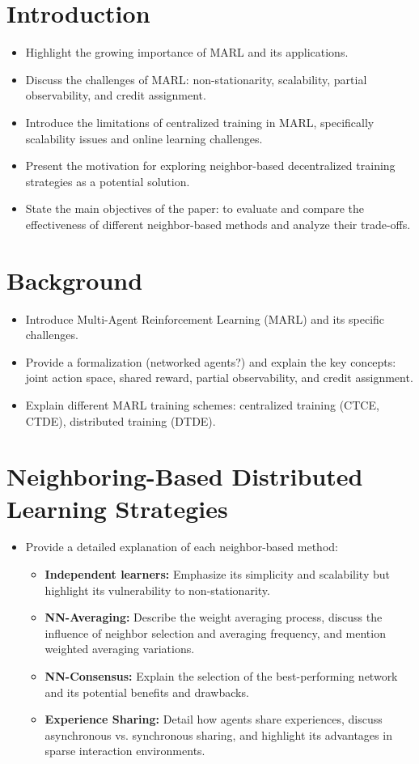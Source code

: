 \documentclass[sigconf]{acmart}
\begin{document}
\section{Introduction}
\begin{itemize}
\item Highlight the growing importance of MARL and its applications.
\item Discuss the challenges of MARL: non-stationarity, scalability, partial observability, and credit assignment.
\item Introduce the limitations of centralized training in MARL, specifically scalability issues and online learning challenges.
\item Present the motivation for exploring neighbor-based decentralized training strategies as a potential solution.
\item State the main objectives of the paper: to evaluate and compare the effectiveness of different neighbor-based methods and analyze their trade-offs.
\end{itemize}

\section{Background}
\begin{itemize}
\item Introduce Multi-Agent Reinforcement Learning (MARL) and its specific challenges.
\item Provide a formalization (networked agents?) and explain the key concepts: joint action space, shared reward, partial observability, and credit assignment.
\item Explain different MARL training schemes: centralized training (CTCE, CTDE), distributed training (DTDE).
\end{itemize}

\section{Neighboring-Based Distributed Learning Strategies}
\begin{itemize}
\item Provide a detailed explanation of each neighbor-based method:
\begin{itemize}
\item \textbf{Independent learners:} Emphasize its simplicity and scalability but highlight its vulnerability to non-stationarity.
\item \textbf{NN-Averaging:} Describe the weight averaging process, discuss the influence of neighbor selection and averaging frequency, and mention weighted averaging variations.
\item \textbf{NN-Consensus:} Explain the selection of the best-performing network and its potential benefits and drawbacks.
\item \textbf{Experience Sharing:} Detail how agents share experiences, discuss asynchronous vs. synchronous sharing, and highlight its advantages in sparse interaction environments.
\end{itemize}
\end{itemize}
\end{document}
